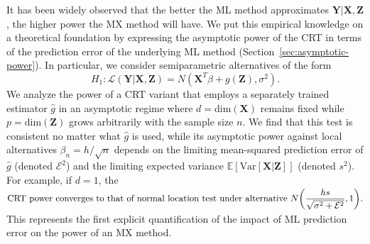 \documentclass[12pt]{article}
\theoremstyle{definition}
\theoremstyle{remark}
\newcommand{\prx}{\bm X}
\newcommand{\prz}{\bm Z}
\newcommand{\srz}{Z}
\newcommand{\pry}{{\bm Y}}
\newcommand{\sry}{Y}
\begin{document}
It has been widely observed that the better the ML method approximates $\pry|\prx,\prz$, the higher power the MX method will have. We put this empirical knowledge on a theoretical foundation by expressing the asymptotic power of the CRT in terms of the prediction error of the underlying ML method (Section~\ref{sec:asymptotic-power}). In particular, we consider semiparametric alternatives of the form
\begin{equation}
H_1: \mathcal L(\pry|\prx,\prz) = N(\prx^T\beta + g(\prz),\sigma^2).
\label{parametric-alternative-intro}
\end{equation}
We analyze the power of a CRT variant that employs a separately trained estimator $\widehat g$ in an asymptotic regime where $d = \text{dim}(\prx)$ remains fixed while $p = \text{dim}(\prz)$ grows arbitrarily with the sample size $n$. We find that this test is consistent no matter what $\widehat g$ is used, while its asymptotic power against local alternatives $\beta_n = h/\sqrt{n}$ depends on the limiting mean-squared prediction error of $\widehat g$ (denoted $\mathcal E^2$) and the limiting expected variance $\mathbb E[\text{Var}[\prx | \prz]]$ (denoted $s^2$). For example, if $d = 1$, the
\begin{equation*}
\begin{split}
\text{CRT power converges to that of normal location test under alternative } N\smash{\left(\frac{hs}{\sqrt{\sigma^2 + \mathcal E^2}},1\right)}.
\end{split}
\end{equation*}
This represents the first explicit quantification of the impact of ML prediction error on the power of an MX method.
\end{document}

